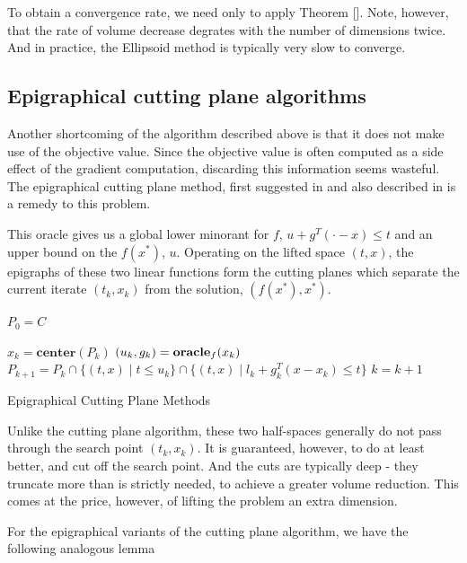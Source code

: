 To obtain a convergence rate, we need only to apply Theorem []. Note, however,
that the rate of volume decrease degrates with the number of dimensions twice. 
And in practice, the Ellipsoid method is typically very slow to converge.


\subsection{Epigraphical cutting plane algorithms}

Another shortcoming of the algorithm described above is that it does not make
use of the objective value. Since the objective value is often computed as a
side effect of the gradient computation, discarding this information seems
wasteful. The epigraphical cutting plane method, first suggested in
\cite{bahn1994experimental} and also described in
\cite{boyd2007localization,goffin1999two,mehrotra2000volumetric} is a remedy
to this problem.

This oracle gives us a global lower minorant for $f$, $u + g^T(\cdot - x) \leq t$ and an upper bound on the $f(x^*)$, $u$. Operating on the lifted space $(t,x)$, the epigraphs of these two linear functions form the cutting planes which separate the current iterate $(t_k, x_k)$ from the solution, $(f(x^*), x^*)$. 
\begin{algorithm} 
  \SetAlgoNoLine
  \DontPrintSemicolon
  $P_0 = C$\;
  
   {
  \nl $x_{k}  = \mathbf{center}(P_k)$\;
  \nl $(u_{k},g_{k})  = \mbox{\bf oracle}_f(x_{k})$\;
  \nl $P_{k+1}  =P_{k}\cap\{(t,x)\mid t\leq u_{k}\}\cap\{(t,x)\mid l_{k}+g_{k}^{T}(x-x_{k})\leq t\}$\;
  \nl $k = k + 1$
  }
  \caption{Epigraphical Cutting Plane Methods \label{alg:cutting_plane_epi}}
\end{algorithm}

Unlike the cutting plane algorithm, these two half-spaces generally do not
pass through the search point $(t_k, x_k)$. It is guaranteed, however, to do
at least better, and cut off the search point. And the cuts are typically deep - they truncate more than is strictly needed, to achieve a greater volume reduction. This comes at the price, however, of lifting the problem an extra dimension.

For the epigraphical variants of the cutting plane algorithm, we have the following analogous lemma

